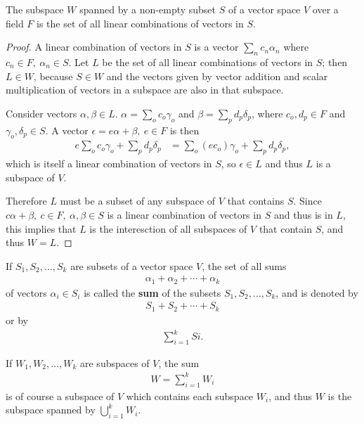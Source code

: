 \documentclass[12pt]{article}
\begin{document}
\begin{thm}
  The subspace $W$ spanned by a non-empty subset $S$ of a vector space $V$ over a
  field $F$ is the set of all linear combinations of vectors in $S$.

  \begin{proof}
    A linear combination of vectors in $S$ is a vector $\sum_{n}c_n\alpha_n$ where
    $c_n \in F,\ \alpha_n \in S$. Let $L$ be the set of all linear combinations of
    vectors in $S$; then $L \in W$, because $S \in W$ and the vectors given by vector
    addition and scalar multiplication of vectors in a subspace are also in that
    subspace.

    Consider vectors $\alpha,\beta \in L$. $\alpha = \sum_{o}c_o\gamma_o$ and $\beta
    = \sum_{p}d_p\delta_p$, where $c_o,d_p \in F$ and $\gamma_o,\delta_p \in S$. A
    vector $\epsilon = e\alpha + \beta,\ e \in F$ is then
    \begin{align*}
      e\sum_{o}c_o\gamma_o + \sum_{p}d_p\delta_p &=
      \sum_{o}(ec_o)\gamma_o + \sum_{p}d_p\delta_p,
    \end{align*}
    which is itself a linear combination of vectors in $S$, so $\epsilon \in L$ and
    thus $L$ is a subspace of $V$.

    Therefore $L$ must be a subset of any subspace of $V$ that contains $S$. Since
    $c\alpha + \beta,\ c \in F,\ \alpha,\beta \in S$ is a linear combination of
    vectors in $S$ and thus is in $L$, this implies that $L$ is the interesction of
    all subspaces of $V$ that contain $S$, and thus $W = L$.
  \end{proof}
\end{thm}

\begin{defn}
  If $S_1,S_2,\ldots,S_k$ are subsets of a vector space $V$, the set of all sums
  \begin{align*}
    \alpha_1 + \alpha_2 + \cdots + \alpha_k
  \end{align*}
  of vectors $\alpha_i \in S_i$ is called the \textbf{sum} of the subsets
  $S_1,S_2,\ldots,S_k$, and is denoted by
  \begin{align*}
    S_1 + S_2 + \cdots + S_k
  \end{align*}
  or by
  \begin{align*}
    \sum_{i = 1}^{k}Si.
  \end{align*}
\end{defn}

\begin{comm}
  If $W_1,W_2,\ldots,W_k$ are subspaces of $V$, the sum
  \begin{align*}
    W = \sum_{i = 1}^{k}W_i
  \end{align*}
  is of course a subspace of $V$ which contains each subspace $W_i$, and thus
  $W$ is the subspace spanned by $\bigcup_{i = 1}^{k}W_i$.
\end{comm}
\end{document}
